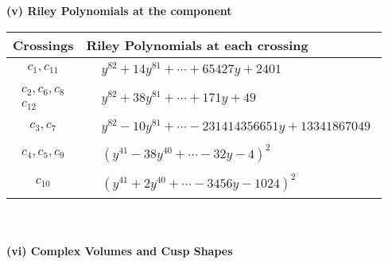 \documentclass[1p]{elsarticle_modified}
\theoremstyle{definition}
\begin{document}
\newpage\renewcommand{\arraystretch}{1}
\flushleft \textbf{(v) Riley Polynomials at the component}\newline \\
\begin{tabular}{m{50pt}|m{274pt}}
Crossings & \hspace{64pt}Riley Polynomials at each crossing \\
\hline $$\begin{aligned}c_{1},c_{11}\end{aligned}$$&$\begin{aligned}
&y^{82}+14 y^{81}+\cdots+65427 y+2401
\end{aligned}$\\
\hline $$\begin{aligned}c_{2},c_{6},c_{8}\\c_{12}\end{aligned}$$&$\begin{aligned}
&y^{82}+38 y^{81}+\cdots+171 y+49
\end{aligned}$\\
\hline $$\begin{aligned}c_{3},c_{7}\end{aligned}$$&$\begin{aligned}
&y^{82}-10 y^{81}+\cdots-231414356651 y+13341867049
\end{aligned}$\\
\hline $$\begin{aligned}c_{4},c_{5},c_{9}\end{aligned}$$&$\begin{aligned}
&(y^{41}-38 y^{40}+\cdots-32 y-4)^{2}
\end{aligned}$\\
\hline $$\begin{aligned}c_{10}\end{aligned}$$&$\begin{aligned}
&(y^{41}+2 y^{40}+\cdots-3456 y-1024)^{2}
\end{aligned}$\\
\hline
\end{tabular}\\~\\
\newpage\flushleft \textbf{(vi) Complex Volumes and Cusp Shapes}
\end{document}
